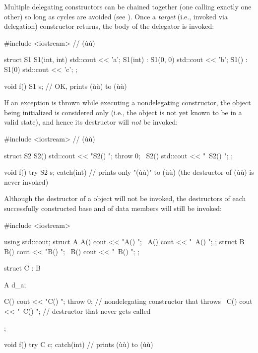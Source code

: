 \noindent Multiple delegating constructors can be chained together (one calling
exactly one other) so long as cycles are avoided (see ).
Once a \emph{target} (i.e., invoked via delegation) constructor returns,
the body of the delegator is invoked:

\begin{emcppslisting}[language=C++]
#include <iostream>  // (ù{}ù)

struct S1
{
    S1(int, int)            { std::cout << 'a'; }
    S1(int)      : S1(0, 0) { std::cout << 'b'; }
    S1()         : S1(0)    { std::cout << 'c'; }
};

void f()
{
    S1 s;  // OK, prints (ù{}ù) to (ù{}ù)
}
\end{emcppslisting}

\noindent If an exception is thrown while executing a nondelegating constructor,
the object being initialized is considered only  (i.e., the object is not yet known to be in a valid state),
and hence its destructor will \emph{not} be
invoked:

\begin{emcppslisting}[language=C++]
#include <iostream>  // (ù{}ù)

struct S2
{
    S2()  { std::cout << "S2() ";  throw 0; }
    ~S2() { std::cout << "~S2() ";          }
};

void f() try { S2 s; } catch(int) { }
    // prints only "(ù{}ù)" to (ù{}ù) (the destructor of (ù{}ù) is never invoked)
\end{emcppslisting}

\noindent Although the destructor of a  object will not be invoked, the destructors of
each successfully constructed base and of data members will still be
invoked:

\begin{emcppslisting}[language=C++]
#include <iostream>

using std::cout;
struct A { A() { cout << "A() "; } ~A() { cout << "~A() "; } };
struct B { B() { cout << "B() "; } ~B() { cout << "~B() "; } };

struct C : B
{
    A d_a;

    C()  { cout << "C() "; throw 0; }  // nondelegating constructor that throws
    ~C() { cout << "~C() ";         }  // destructor that never gets called
};

void f() try { C c; } catch(int) { }
    // prints (ù{}ù) to (ù{}ù)
\end{emcppslisting}

